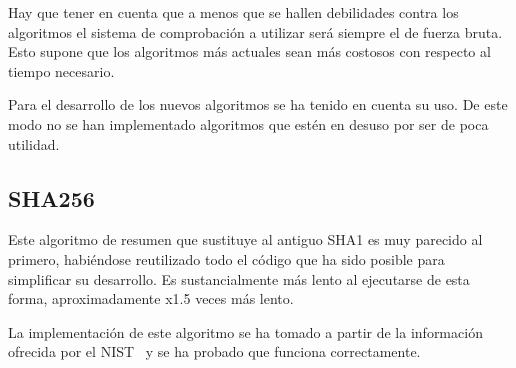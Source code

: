 Hay que tener en cuenta que a menos que se hallen debilidades contra los algoritmos el sistema de comprobación a utilizar será siempre el de fuerza bruta. Esto supone que los algoritmos más actuales sean más costosos con respecto al tiempo necesario.

Para el desarrollo de los nuevos algoritmos se ha tenido en cuenta su uso. De este modo no se han implementado algoritmos que estén en desuso por ser de poca utilidad.

\subsection{SHA256}

Este algoritmo de resumen que sustituye al antiguo SHA1 es muy parecido al primero, habiéndose reutilizado todo el código que ha sido posible para simplificar su desarrollo. Es sustancialmente más lento al ejecutarse de esta forma, aproximadamente x1.5 veces más lento.

La implementación de este algoritmo se ha tomado a partir de la información ofrecida por el NIST~\cite{nist:shs} y se ha probado que funciona correctamente.

